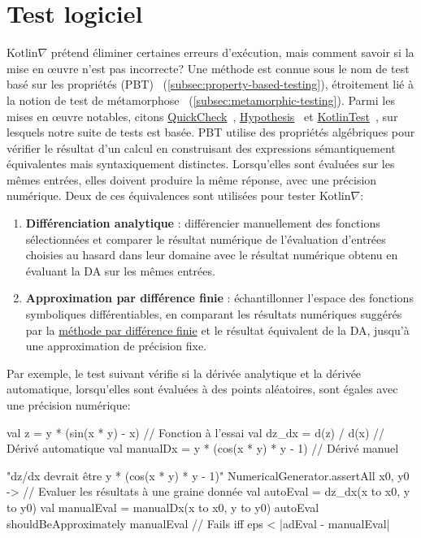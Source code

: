 \section{Test logiciel}\label{sec:testing}

Kotlin$\nabla$ prétend éliminer certaines erreurs d'exécution, mais comment savoir si la mise en œuvre n'est pas incorrecte? Une méthode est connue sous le nom de test basé sur les propriétés (PBT)~\citep{fink1997property} (\autoref{subsec:property-based-testing}), étroitement lié à la notion de test de métamorphose~\citep{chen1998metamorphic} (\autoref{subsec:metamorphic-testing}). Parmi les mises en œuvre notables, citons \href{http://www.cse.chalmers.se/~rjmh/QuickCheck/manual.html}{QuickCheck}~\citep{claessen2011quickcheck}, \href{https://hypothesis.readthedocs.io/en/latest/}{Hypothesis}~\citep{Hypothesis} et \href{https://github.com/kotlintest/kotlintest}{KotlinTest}~\citep{kotlintest}, sur lesquels notre suite de tests est basée. PBT utilise des propriétés algébriques pour vérifier le résultat d'un calcul en construisant des expressions sémantiquement équivalentes mais syntaxiquement distinctes. Lorsqu'elles sont évaluées sur les mêmes entrées, elles doivent produire la même réponse, avec une précision numérique. Deux de ces équivalences sont utilisées pour tester Kotlin$\nabla$: \\
%
\begin{enumerate}
\item \textbf{Différenciation analytique} : différencier manuellement des fonctions sélectionnées et comparer le résultat numérique de l'évaluation d'entrées choisies au hasard dans leur domaine avec le résultat numérique obtenu en évaluant la DA sur les mêmes entrées.
\item \textbf{Approximation par différence finie} : échantillonner l'espace des fonctions symboliques différentiables, en comparant les résultats numériques suggérés par la \hyperref[sec:fdm]{méthode par différence finie} et le résultat équivalent de la DA, jusqu'à une approximation de précision fixe. \\
\end{enumerate}
%
Par exemple, le test suivant vérifie si la dérivée analytique et la dérivée automatique, lorsqu'elles sont évaluées à des points aléatoires, sont égales avec une précision numérique:
%
\begin{kotlinlisting}
val z = y * (sin(x * y) - x)            // Fonction à l'essai
val dz_dx = d(z) / d(x)                 // Dérivé automatique
val manualDx = y * (cos(x * y) * y - 1) // Dérivé manuel

"dz/dx devrait être y * (cos(x * y) * y - 1)" {
    NumericalGenerator.assertAll { x0, y0 ->
        // Evaluer les résultats à une graine donnée
        val autoEval = dz_dx(x to x0, y to y0)
        val manualEval = manualDx(x to x0, y to y0)
        autoEval shouldBeApproximately manualEval // Fails iff eps < |adEval - manualEval|
    }
}
\end{kotlinlisting}
